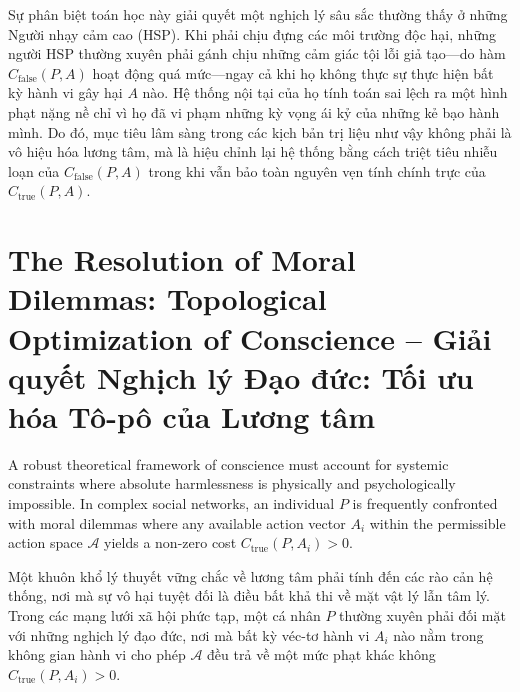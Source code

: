 \documentclass{report}
\begin{document}
Sự phân biệt toán học này giải quyết một nghịch lý sâu sắc thường thấy ở những Người nhạy cảm cao (HSP). Khi phải chịu đựng các môi trường độc hại, những người HSP thường xuyên phải gánh chịu những cảm giác tội lỗi giả tạo—do hàm $C_{\text{false}}(P,A)$ hoạt động quá mức—ngay cả khi họ không thực sự thực hiện bất kỳ hành vi gây hại $A$ nào. Hệ thống nội tại của họ tính toán sai lệch ra một hình phạt nặng nề chỉ vì họ đã vi phạm những kỳ vọng ái kỷ của những kẻ bạo hành mình. Do đó, mục tiêu lâm sàng trong các kịch bản trị liệu như vậy không phải là vô hiệu hóa lương tâm, mà là hiệu chỉnh lại hệ thống bằng cách triệt tiêu nhiễu loạn của $C_{\text{false}}(P,A)$ trong khi vẫn bảo toàn nguyên vẹn tính chính trực của $C_{\text{true}}(P,A)$.

\section{The Resolution of Moral Dilemmas: Topological Optimization of Conscience -- Giải quyết Nghịch lý Đạo đức: Tối ưu hóa Tô-pô của Lương tâm}

A robust theoretical framework of conscience must account for systemic constraints where absolute harmlessness is physically and psychologically impossible. In complex social networks, an individual $P$ is frequently confronted with moral dilemmas where any available action vector $A_i$ within the permissible action space $\mathcal{A}$ yields a non-zero cost $C_{\text{true}}(P, A_i) > 0$.

Một khuôn khổ lý thuyết vững chắc về lương tâm phải tính đến các rào cản hệ thống, nơi mà sự vô hại tuyệt đối là điều bất khả thi về mặt vật lý lẫn tâm lý. Trong các mạng lưới xã hội phức tạp, một cá nhân $P$ thường xuyên phải đối mặt với những nghịch lý đạo đức, nơi mà bất kỳ véc-tơ hành vi $A_i$ nào nằm trong không gian hành vi cho phép $\mathcal{A}$ đều trả về một mức phạt khác không $C_{\text{true}}(P, A_i) > 0$.
\end{document}
